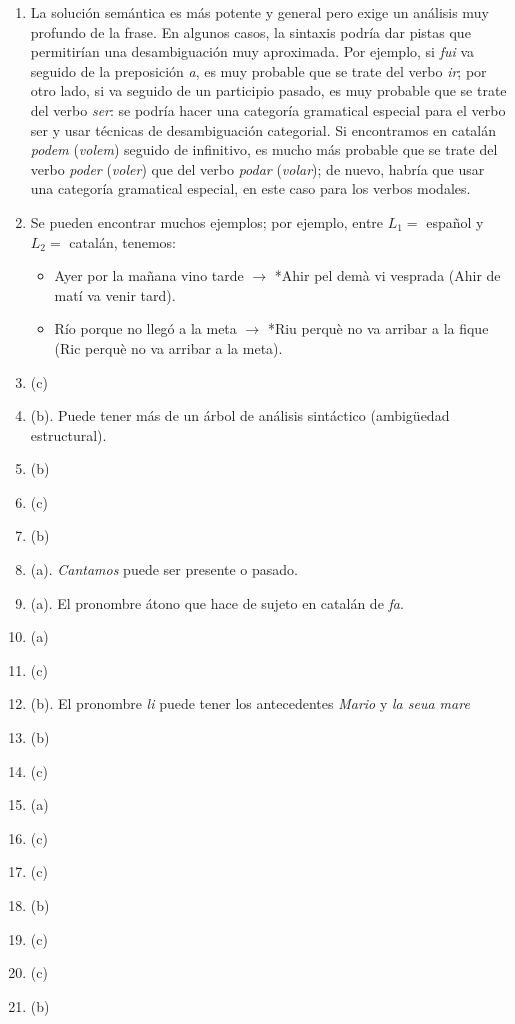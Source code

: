 \begin{enumerate}
\item La solución semántica es más potente y general pero exige un análisis muy profundo de la frase. En algunos casos, la sintaxis podría dar pistas que permitirían una desambiguación muy aproximada. Por ejemplo, si {\em fui\/} va seguido de la preposición {\em a}, es muy probable que se trate del verbo {\em ir}; por otro lado, si va seguido de un participio pasado, es muy probable que se trate del verbo {\em ser\/}: se podría hacer una categoría gramatical especial para el verbo ser y usar técnicas de desambiguación categorial. Si encontramos en catalán {\em podem\/} ({\em volem\/}) seguido de infinitivo, es mucho más probable que se trate del verbo {\em poder\/} ({\em voler\/}) que del verbo {\em podar} ({\em volar\/}); de nuevo, habría que usar una categoría gramatical especial, en este caso para los verbos modales. 

\item Se pueden encontrar muchos ejemplos; por ejemplo, entre $L_1 =$ español y $L_2 =$ catalán, tenemos: \begin{itemize} \item Ayer por la mañana vino tarde $\rightarrow$ *Ahir pel demà vi vesprada (Ahir de matí va venir tard). \item Río porque no llegó a la meta $\rightarrow$ *Riu perquè no va arribar a la fique (Ric perquè no va arribar a la meta). \end{itemize} 

\item (c) \item (b). Puede tener más de un árbol de análisis sintáctico (ambigüedad estructural). \item (b) \item (c) \item (b) \item (a). \emph{Cantamos} puede ser presente o pasado. \item (a). El pronombre átono que hace de sujeto en catalán de \emph{fa}. \item (a) 

\item (c) \item (b). El pronombre \emph{li} puede tener los antecedentes \emph{Mario} y \emph{la seua mare} \item (b) \item (c) \item (a) \item (c) \item (c) \item (b) \item (c) \item (c) \item (b) \end{enumerate} 

